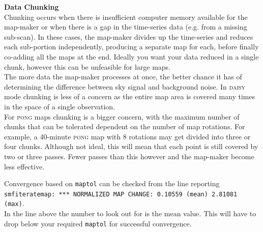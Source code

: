 \documentclass[twoside,11pt]{article}
\newenvironment{latexonly}{}{}
\renewcommand{\_}{\texttt{\symbol{95}}}
\newenvironment{fmpage}[1]{\begin{lrbox}{\fmbox}\begin{minipage}{#1}}{\end{minipage}\end{lrbox}\fbox{\usebox{\fmbox}}}
\begin{document}
\begin{latexonly}
\begin{center}
\begin{fmpage}{0.92\linewidth}
\label{page:text}
\begin{minipage}[t]{0.025\linewidth}
\hspace{0.1cm}
\end{minipage}
\begin{minipage}[t]{0.93\linewidth}
\vspace{0.2cm}
\textbf{Data Chunking}\\
Chunking occurs when there is insufficient computer memory available
for the map-maker or when there is a gap in the time-series data (e.g.
from a missing sub-scan). In these cases, the map-maker divides up the
time-series and reduces each sub-portion independently, producing a
separate map for each, before finally co-adding all the maps at the
end. Ideally you want your data reduced in a single chunk, however
this can be unfeasible for large maps.
\vspace{0.2cm}\\
The more data the map-maker processes at once, the better chance it
has of determining the difference between sky signal and background
noise. In \textsc{daisy} mode chunking is less of a concern as
the entire map area is covered many times in the space of a single
observation.
\vspace{0.2cm}\\
For \textsc{pong} maps chunking is a bigger concern, with the
maximum number of chunks that can be tolerated dependent on the number
of map rotations. For example, a 40-minute \textsc{pong} map with 8
rotations may get divided into three or four chunks. Although not
ideal, this will mean that each point is still covered by two or three
passes. Fewer passes than this however and the map-maker become less
effective.
\vspace{0.2cm}
\end{minipage}
\begin{minipage}[t]{0.025\linewidth}
\hspace{0.1cm}
\end{minipage}
\end{fmpage}
\end{center}
\end{latexonly}

Convergence based on \texttt{maptol} can be checked from the line
reporting\\
\hspace{5mm}\texttt{smf\_iteratemap: *** NORMALIZED MAP
CHANGE: 0.10559 (mean) 2.81081 (max)}.\\
In the line above the number to look out for is the mean value. This
will have to drop below your required \texttt{maptol} for successful
convergence.
\end{document}
